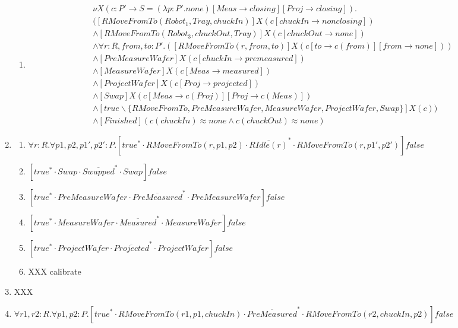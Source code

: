 \begin{enumerate}
\begin{enumerate}
        \item \begin{align*}
            &\nu X(c:P'\rightarrow S = (\lambda p:P'.none)[Meas\rightarrow closing][Proj \rightarrow closing]). \\
            &([RMoveFromTo(Robot_1, Tray, chuckIn)]X(c[chuckIn \rightarrow nonclosing]) \\
            &\wedge [RMoveFromTo(Robot_3, chuckOut, Tray)]X(c[chuckOut \rightarrow none]) \\
            &\wedge \forall r : R, from, to : P'.([RMoveFromTo(r, from, to)]X(c[to \rightarrow c(from)][from \rightarrow none])) \\
            &\wedge [PreMeasureWafer]X(c[chuckIn \rightarrow premeasured]) \\
            &\wedge [MeasureWafer]X(c[Meas \rightarrow measured]) \\
            &\wedge [ProjectWafer]X(c[Proj \rightarrow projected]) \\
            &\wedge [Swap]X(c[Meas \rightarrow c(Proj)][Proj \rightarrow c(Meas)]) \\
            &\wedge [true \backslash \{RMoveFromTo, PreMeasureWafer, MeasureWafer, ProjectWafer, Swap\}]X(c)) \\
            &\wedge [Finished](c(chuckIn)\approx none \wedge c(chuckOut) \approx none)
        \end{align*}
    \end{enumerate}
    \item \begin{enumerate}
        \item $\forall r:R.\forall p1,p2,p1',p2':P.[true^{*}\cdot RMoveFromTo(r, p1, p2) \cdot \overline{RIdle(r)}^{*} \cdot RMoveFromTo(r, p1', p2')]false$
        \item $[true^{*}\cdot Swap \cdot \overline{Swapped}^{*} \cdot Swap]false$
        \item $[true^{*}\cdot PreMeasureWafer \cdot \overline{PreMeasured}^{*} \cdot PreMeasureWafer]false$
        \item $[true^{*}\cdot MeasureWafer \cdot \overline{Measured}^{*} \cdot MeasureWafer]false$
        \item $[true^{*}\cdot ProjectWafer \cdot \overline{Projected}^{*} \cdot ProjectWafer]false$
        \item XXX calibrate
    \end{enumerate}
    \item XXX
    \item $\forall r1,r2:R.\forall p1,p2:P.[true^{*}\cdot RMoveFromTo(r1, p1, chuckIn) \cdot \overline{PreMeasured}^{*} \cdot RMoveFromTo(r2, chuckIn, p2)]false$

\end{enumerate}
